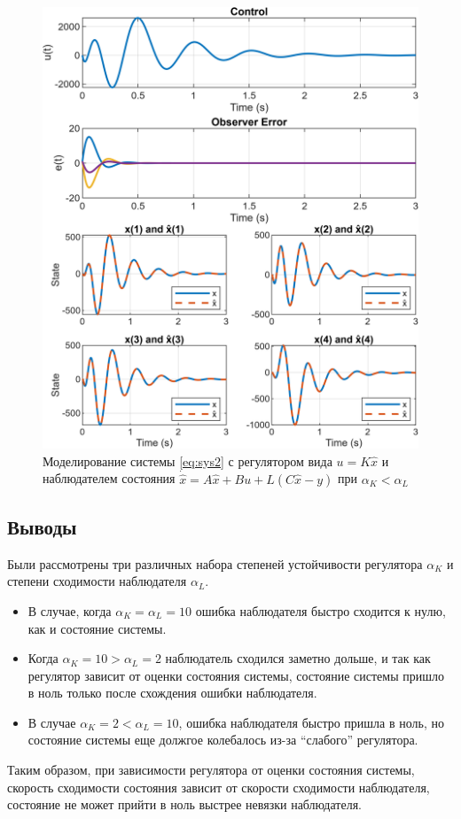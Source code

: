 \begin{figure}[H]
    \centering
    \includegraphics[width=\linewidth]{figs/task2_3.png}
    \caption{Моделирование системы \eqref{eq:sys2} с регулятором вида $u=K\hat x$
    и наблюдателем состояния $\dot{\hat x}=A\hat x+Bu+L(C\hat x-y)$ при $\alpha_K<\alpha_L$}
    \label{fig:23}
\end{figure}

\newpage
\subsection{Выводы}

Были рассмотрены три различных набора степеней устойчивости регулятора $\alpha_K$ 
и степени сходимости наблюдателя $\alpha_L$. 
\begin{itemize}
    \item В случае, когда $\alpha_K = \alpha_L = 10$ ошибка наблюдателя быстро сходится к нулю,
    как и состояние системы. 
    \item Когда $\alpha_K=10 > \alpha_L=2$ наблюдатель сходился заметно дольше, и так как
    регулятор зависит от оценки состояния системы, состояние системы пришло в ноль только
    после схождения ошибки наблюдателя.
    \item В случае $\alpha_K=2 < \alpha_L=10$, ошибка наблюдателя быстро пришла в ноль, но
    состояние системы еще должгое колебалось из-за ``слабого'' регулятора.
\end{itemize}
Таким образом, при зависимости регулятора от оценки состояния системы, скорость
сходимости состояния зависит от скорости сходимости наблюдателя, состояние не может
прийти в ноль выстрее невязки наблюдателя.



